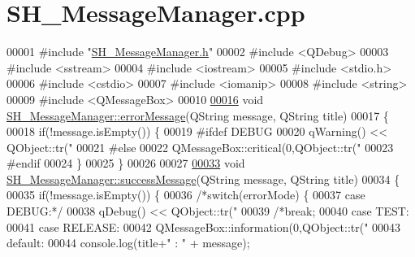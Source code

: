\hypertarget{SH__MessageManager_8cpp_source}{\section{S\-H\-\_\-\-Message\-Manager.\-cpp}
}

\begin{DoxyCode}
00001 \textcolor{preprocessor}{#include "\hyperlink{SH__MessageManager_8h}{SH\_MessageManager.h}"}
00002 \textcolor{preprocessor}{#include <QDebug>}
00003 \textcolor{preprocessor}{#include <sstream>}
00004 \textcolor{preprocessor}{#include <iostream>}
00005 \textcolor{preprocessor}{#include <stdio.h>}
00006 \textcolor{preprocessor}{#include <cstdio>}
00007 \textcolor{preprocessor}{#include <iomanip>}
00008 \textcolor{preprocessor}{#include <string>}
00009 \textcolor{preprocessor}{#include <QMessageBox>}
00010 
\hypertarget{SH__MessageManager_8cpp_source_l00016}{}\hyperlink{classSH__MessageManager_acb5615cc90f198f4768da800a5d32362}{00016} \textcolor{keywordtype}{void} \hyperlink{classSH__MessageManager_acb5615cc90f198f4768da800a5d32362}{SH\_MessageManager::errorMessage}(QString message, QString title)
00017 \{
00018     \textcolor{keywordflow}{if}(!message.isEmpty()) \{
00019 \textcolor{preprocessor}{#ifdef DEBUG}
00020 \textcolor{preprocessor}{}        qWarning() << QObject::tr(\textcolor{stringliteral}{"%
00021 \textcolor{preprocessor}{#else}
00022 \textcolor{preprocessor}{}        QMessageBox::critical(0,QObject::tr(\textcolor{stringliteral}{"%
00023 \textcolor{preprocessor}{#endif}
00024 \textcolor{preprocessor}{}    \}
00025 \}
00026 
00027 
\hypertarget{SH__MessageManager_8cpp_source_l00033}{}\hyperlink{classSH__MessageManager_a7d69b7cb8082f97cd3b6c8d446058959}{00033} \textcolor{keywordtype}{void} \hyperlink{classSH__MessageManager_a7d69b7cb8082f97cd3b6c8d446058959}{SH\_MessageManager::successMessage}(QString message, QString title)
00034 \{
00035     \textcolor{keywordflow}{if}(!message.isEmpty()) \{
00036         \textcolor{comment}{/*switch(errorMode) \{}
00037 \textcolor{comment}{    case DEBUG:*/}
00038         qDebug() << QObject::tr(\textcolor{stringliteral}{"%
00039         \textcolor{comment}{/*break;}
00040 \textcolor{comment}{    case TEST:}
00041 \textcolor{comment}{    case RELEASE:}
00042 \textcolor{comment}{        QMessageBox::information(0,QObject::tr("%
00043 \textcolor{comment}{    default:}
00044 \textcolor{comment}{        console.log(title+" : " + message);}
}}}}
\end{DoxyCode}

